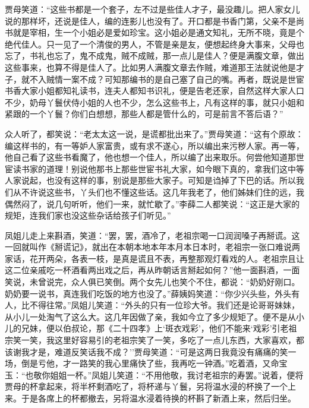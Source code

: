 贾母笑道：``这些书都是一个套子，左不过是些佳人才子，最没趣儿。把人家女儿说的那样坏，还说是佳人，编的连影儿也没有了。开口都是书香门第，父亲不是尚书就是宰相，生一个小姐必是爱如珍宝。这小姐必是通文知礼，无所不晓，竟是个绝代佳人。只一见了一个清俊的男人，不管是亲是友，便想起终身大事来，父母也忘了，书礼也忘了，鬼不成鬼，贼不成贼，那一点儿是佳人？便是满腹文章，做出这些事来，也算不得是佳人了。比如男人满腹文章去作贼，难道那王法就说他是才子，就不入贼情一案不成？可知那编书的是自己塞了自己的嘴。再者，既说是世宦书香大家小姐都知礼读书，连夫人都知书识礼，便是告老还家，自然这样大家人口不少，奶母丫鬟伏侍小姐的人也不少，怎么这些书上，凡有这样的事，就只小姐和紧跟的一个丫鬟？你们白想想，那些人都是管什么的，可是前言不答后语？''

众人听了，都笑说：``老太太这一说，是谎都批出来了。''贾母笑道：``这有个原故：编这样书的，有一等妒人家富贵，或有求不遂心，所以编出来污秽人家。再一等，他自己看了这些书看魔了，他也想一个佳人，所以编了出来取乐。何尝他知道那世宦读书家的道理！别说他那书上那些世宦书礼大家，如今眼下真的，拿我们这中等人家说起，也没有这样的事，别说是那些大家子。可知是诌掉了下巴的话。所以我们从不许说这些书，丫头们也不懂这些话。这几年我老了，他们姊妹们住的远，我偶然闷了，说几句听听，他们一来，就忙歇了。''李薛二人都笑说：``这正是大家的规矩，连我们家也没这些杂话给孩子们听见。''

凤姐儿走上来斟酒，笑道：``罢，罢，酒冷了，老祖宗喝一口润润嗓子再掰谎。这一回就叫作《掰谎记》，就出在本朝本地本年本月本日本时，老祖宗一张口难说两家话，花开两朵，各表一枝，是真是谎且不表，再整那观灯看戏的人。老祖宗且让这二位亲戚吃一杯酒看两出戏之后，再从昨朝话言掰起如何？''他一面斟酒，一面笑说，未曾说完，众人俱已笑倒。两个女先儿也笑个不住，都说：``奶奶好刚口。奶奶要一说书，真连我们吃饭的地方也没了。''薛姨妈笑道：``你少兴头些，外头有人，比不得往常。''凤姐儿笑道：``外头的只有一位珍大爷。我们还是论哥哥妹妹，从小儿一处淘气了这么大。这几年因做了亲，我如今立了多少规矩了。便不是从小儿的兄妹，便以伯叔论，那《二十四孝》上`斑衣戏彩'，他们不能来`戏彩'引老祖宗笑一笑，我这里好容易引的老祖宗笑了一笑，多吃了一点儿东西，大家喜欢，都该谢我才是，难道反笑话我不成？''贾母笑道：``可是这两日我竟没有痛痛的笑一场，倒是亏他，才一路笑的我心里痛快了些，我再吃一钟酒。''吃着酒，又命宝玉：``也敬你姐姐一杯。''凤姐儿笑道：``不用他敬，我讨老祖宗的寿罢。''说着，便将贾母的杯拿起来，将半杯剩酒吃了，将杯递与丫鬟，另将温水浸的杯换了一个上来。于是各席上的杯都撤去，另将温水浸着待换的杯斟了新酒上来，然后归坐。

